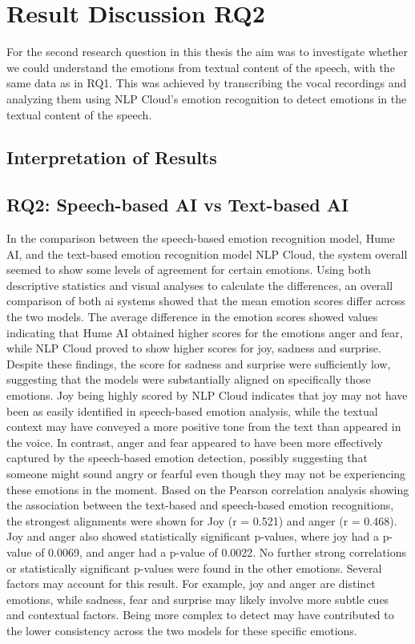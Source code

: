 
\section{Result Discussion RQ2}
For the second research question in this thesis the aim was to investigate whether we could understand the emotions from textual content of the speech, with the same data as in RQ1. This was achieved by transcribing the vocal recordings and analyzing them using NLP Cloud’s emotion recognition to detect emotions in the textual content of the speech.

\subsection{Interpretation of Results}
\subsection{RQ2: Speech-based AI vs Text-based AI}
In the comparison between the speech-based emotion recognition model, Hume AI, and the text-based emotion recognition model NLP Cloud, the system overall seemed to show some levels of agreement for certain emotions. Using both descriptive statistics and visual analyses to calculate the differences, an overall comparison of both ai systems showed that the mean emotion scores differ across the two models.
The average difference in the emotion scores showed values indicating that Hume AI obtained higher scores for the emotions anger and fear, while NLP Cloud proved to show higher scores for joy, sadness and surprise. Despite these findings, the score for sadness and surprise were sufficiently low, suggesting that the models were substantially aligned on specifically those emotions.
Joy being highly scored by NLP Cloud indicates that joy may not have been as easily identified in speech-based emotion analysis, while the textual context may have conveyed a more positive tone from the text than appeared in the voice. In contrast, anger and fear appeared to have been more effectively captured by the speech-based emotion detection, possibly suggesting that someone might sound angry or fearful even though they may not be experiencing these emotions in the moment.
Based on the Pearson correlation analysis showing the association between the text-based and speech-based emotion recognitions, the strongest alignments were shown for Joy (r = 0.521) and anger (r = 0.468). Joy and anger also showed statistically significant p-values, where joy had a p-value of 0.0069, and anger had a p-value of 0.0022. No further strong correlations or statistically significant p-values were found in the other emotions.
Several factors may account for this result. For example, joy and anger are distinct emotions, while sadness, fear and surprise may likely involve more subtle cues and contextual factors. Being more complex to detect may have contributed to the lower consistency across the two models for these specific emotions.

